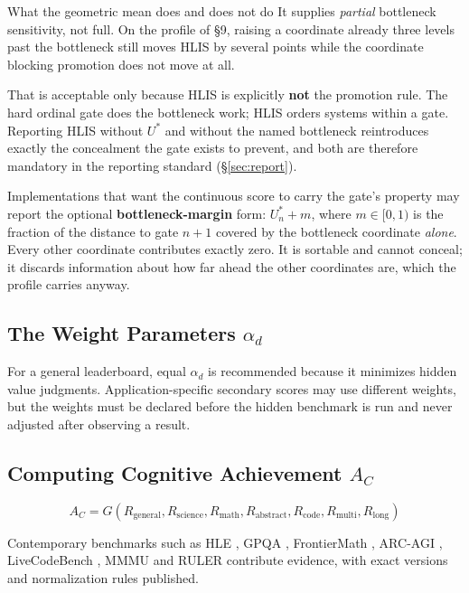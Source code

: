 \documentclass[11pt]{article}
\theoremstyle{definition}
\begin{document}
\begin{cautionbox}{What the geometric mean does and does not do}
It supplies \emph{partial} bottleneck sensitivity, not full. On the profile of \S9, raising a coordinate already three levels past the bottleneck still moves HLIS by several points while the coordinate blocking promotion does not move at all.

That is acceptable only because HLIS is explicitly \textbf{not} the promotion rule. The hard ordinal gate does the bottleneck work; HLIS orders systems within a gate. Reporting HLIS without $U^{*}$ and without the named bottleneck reintroduces exactly the concealment the gate exists to prevent, and both are therefore mandatory in the reporting standard (\S\ref{sec:report}).

Implementations that want the continuous score to carry the gate's property may report the optional \textbf{bottleneck-margin} form: $U^{*}_n + m$, where $m \in [0,1)$ is the fraction of the distance to gate $n{+}1$ covered by the bottleneck coordinate \emph{alone}. Every other coordinate contributes exactly zero. It is sortable and cannot conceal; it discards information about how far ahead the other coordinates are, which the profile carries anyway.
\end{cautionbox}

\subsection{The Weight Parameters \texorpdfstring{$\alpha_d$}{alpha-d}}

\sloppy For a general leaderboard, equal $\alpha_d$ is recommended because it minimizes hidden value judgments. Application-specific secondary scores may use different weights, but the weights must be declared before the hidden benchmark is run and never adjusted after observing a result.

\subsection{Computing Cognitive Achievement \texorpdfstring{$A_C$}{A-C}}

\begin{equation}
A_C = G(R_{\text{general}}, R_{\text{science}}, R_{\text{math}}, R_{\text{abstract}}, R_{\text{code}}, R_{\text{multi}}, R_{\text{long}})
\end{equation}

Contemporary benchmarks such as HLE \citep{phan2025hle}, GPQA \citep{rein2023gpqa}, FrontierMath \citep{glazer2024frontiermath}, ARC-AGI \citep{arc2026}, LiveCodeBench \citep{jain2024livecodebench}, MMMU \citep{yue2023mmmu} and RULER \citep{hsieh2024ruler} contribute evidence, with exact versions and normalization rules published.
\end{document}
